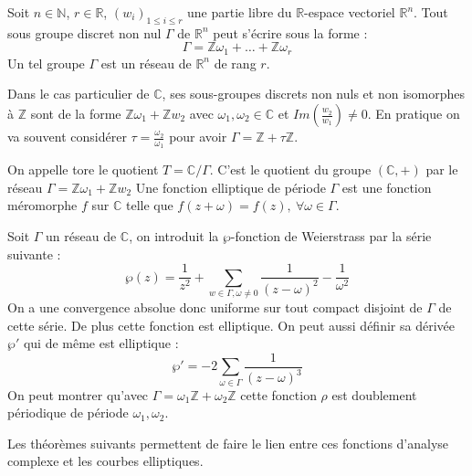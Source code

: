\documentclass[12pt]{article}
\begin{document}
\begin{prop}
Soit $n \in \mathbb{N}$, $r \in \mathbb{R}$, $(w_i)_{1 \leq i \leq r}$ une partie libre du $\mathbb{R}$-espace vectoriel $\mathbb{R}^n$. Tout sous groupe discret non nul $\Gamma$ de $\mathbb{R}^n$ peut s'écrire sous la forme :
\begin{equation*}
\Gamma = \mathbb{Z} \omega_1 + \ldots + \mathbb{Z} \omega_r
\end{equation*}
Un tel groupe $\Gamma$ est un réseau de $\mathbb{R}^n$ de rang $r$.
\end{prop}
Dans le cas particulier de $\mathbb{C}$, ses sous-groupes discrets non nuls et non isomorphes à $\mathbb{Z}$ sont de la forme $\mathbb{Z}\omega_1 + \mathbb{Z}w_2$ avec $\omega_1, \omega_2 \in \mathbb{C}$ et $Im(\frac{w_2}{w_1}) \ne 0$. En pratique on va souvent considérer $\tau = \frac{\omega_2}{\omega_1}$ pour avoir $\Gamma = \mathbb{Z} + \tau \mathbb{Z}$.

\begin{defi}
On appelle tore le quotient $T = \mathbb{C}/ \Gamma$. C'est le quotient du groupe $(\mathbb{C}, +)$ par le réseau $\Gamma = \mathbb{Z}\omega_1 + \mathbb{Z}w_2$
\newline
Une fonction elliptique de période $\Gamma$ est une fonction méromorphe $f$ sur $\mathbb{C}$ telle que $f(z + \omega) = f(z) ,\ \forall \omega \in \Gamma$.
\end{defi}

\begin{defi}
Soit $\Gamma$ un réseau de $\mathbb{C}$, on introduit la $\wp$-fonction de Weierstrass par la série suivante :
\begin{equation*}
\wp(z) = \frac{1}{z^2} + \sum_{w \in \Gamma, \omega \ne 0} \frac{1}{(z-\omega)^2} - \frac{1}{\omega^2}
\end{equation*}
On a une convergence absolue donc uniforme sur tout compact disjoint de $\Gamma$ de cette série. De plus cette fonction est elliptique. On peut aussi définir sa dérivée ${\wp'}$ qui de même est elliptique :
\begin{equation*}
{\wp'} = -2 \sum_{\omega \in \Gamma} \frac{1}{(z-\omega)^3}
\end{equation*}
On peut montrer qu'avec $\Gamma = \omega_1 \mathbb{Z} + \omega_2 \mathbb{Z}$ cette fonction $\rho$ est doublement périodique de période $\omega_1, \omega_2$.
\end{defi}

Les théorèmes suivants permettent de faire le lien entre ces fonctions d'analyse complexe et les courbes elliptiques.
\end{document}
